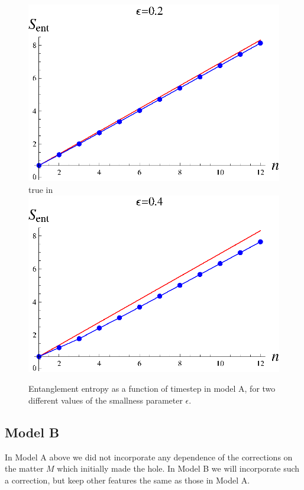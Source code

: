 \documentclass[11pt]{article}
\begin{document}
\begin{figure}[htbp]
\begin{center}
\includegraphics[scale=.58]{modela2.eps} true in
\includegraphics[scale=.58]{modela4.eps}
\caption{{Entanglement entropy as a function of timestep in model A, for  two different values of the smallness parameter $\epsilon$.}}
\label{fn4m}
\end{center}
\end{figure}

\subsection{Model B}

In Model A above we did not incorporate any dependence of the corrections on the matter $M$ which initially made the hole. In Model B we will incorporate such a correction, but keep other features the same as those in Model A.
\end{document}
